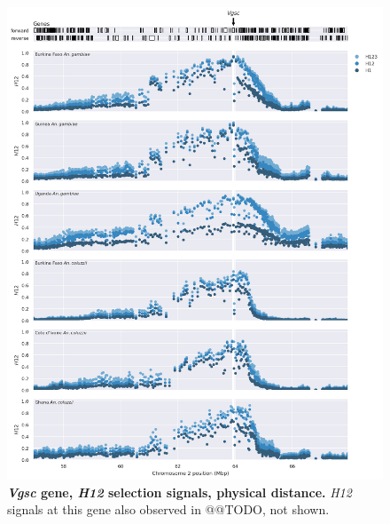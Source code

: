 \documentclass[a4paper,11pt,abstracton,hidelinks]{scrartcl}
\begin{document}
\begin{figure}[t!]
	\begin{center}
		\includegraphics*[width=1.1\linewidth,center]{artwork/locus_vgsc_h12_pdist.png}
	\end{center}
	\caption[\textit{Vgsc} gene, \textit{H12} selection signals, physical distance]{
	\textbf{\textit{Vgsc} gene, \textit{H12} selection signals, physical distance.}
	\textit{H12} signals at this gene also observed in @@TODO, not shown. 
	} 
	\label{fig:locus_vgsc_h12_pdist}
\end{figure}



\clearpage
\end{document}
